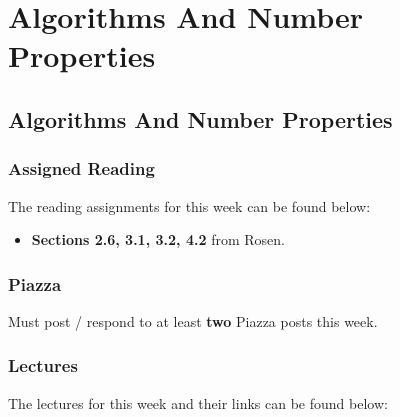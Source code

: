 \clearpage

\renewcommand{\ChapTitle}{Algorithms And Number Properties}
\renewcommand{\SectionTitle}{Algorithms And Number Properties}

\chapter{\ChapTitle}
\section{\SectionTitle}

\subsection{Assigned Reading}

The reading assignments for this week can be found below:

\begin{itemize}
    \item \textbf{Sections 2.6, 3.1, 3.2, 4.2} from Rosen.
\end{itemize}

\subsection{Piazza}

Must post / respond to at least \textbf{two} Piazza posts this week.  

\subsection{Lectures}

The lectures for this week and their links can be found below:

